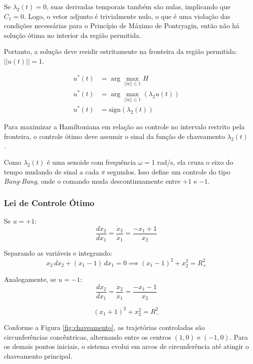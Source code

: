 \documentclass[a4paper, 12pt]{article}%
\begin{document}
Se $\lambda_2(t) = 0$, suas derivadas temporais também são nulas, implicando que $C_1 = 0$. Logo, o vetor adjunto é trivialmente nulo, o que é uma violação das condições necessárias para o Princípio de Máximo de Pontryagin, então não há solução ótima no interior da região permitida.

Portanto, a solução deve residir estritamente na fronteira da região permitida: $|| u(t) || = 1$.

\begin{align}
    u^*(t) &= \arg \underset{||u|| \le 1}{\max} H \\
    u^*(t) &= \arg \underset{||u|| \le 1}{\max} (\lambda_2 u(t)) \\
    u^*(t) &= \text{sign}(\lambda_2(t))
\end{align}

Para maximizar a Hamiltoniana em relação ao controle no intervalo restrito pela fronteira, o controle ótimo deve assumir o sinal da função de chaveamento $\lambda_2(t)$.

Como $\lambda_2(t)$ é uma senoide com frequência $\omega = 1$ rad/s, ela cruza o eixo do tempo mudando de sinal a cada $\pi$ segundos. Isso define um controle do tipo \textit{Bang-Bang}, onde o comando muda descontinuamente entre $+1$ e $-1$.

\subsubsection*{Lei de Controle Ótimo}

Se $u = +1$:
\begin{equation}
    \frac{dx_2}{dx_1} = \frac{\dot{x}_2}{\dot{x}_1} = \frac{-x_1 + 1}{x_2}
\end{equation}

Separando as variáveis e integrando:
\begin{equation}
    x_2 \, dx_2 + (x_1 - 1) \, dx_1 = 0 \implies (x_1 - 1)^2 + x_2^2 = R_+^2
\end{equation}

Analogamente, se $u = -1$:
\begin{equation}
    \frac{dx_2}{dx_1} = \frac{\dot{x}_2}{\dot{x}_1} = \frac{-x_1 - 1}{x_2}
\end{equation}

\begin{equation}
    (x_1 + 1)^2 + x_2^2 = R_-^2
\end{equation}

Conforme a Figura \ref{fig:chaveamento}, as trajetórias controladas são circunferências concêntricas, alternando entre os centros $(1, 0)$ e $(-1, 0)$. Para os demais pontos iniciais, o sistema evolui em arcos de circunferência até atingir o chaveamento principal.
\end{document}
